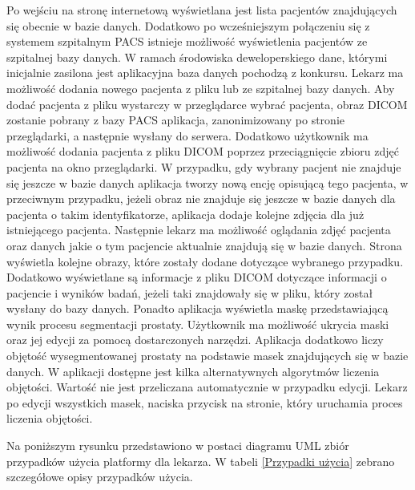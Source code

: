 \documentclass[a4paper,11pt,twoside]{report}
\theoremstyle{definition}
\begin{document}
Po wejściu na stronę internetową wyświetlana jest lista pacjentów znajdujących się obecnie w bazie danych. Dodatkowo po wcześniejszym połączeniu się z systemem szpitalnym PACS istnieje możliwość wyświetlenia pacjentów ze szpitalnej bazy danych. W ramach środowiska deweloperskiego dane, którymi inicjalnie zasilona jest aplikacyjna baza danych pochodzą z konkursu. \cite{konkurs}
Lekarz ma możliwość dodania nowego pacjenta z pliku lub ze szpitalnej bazy danych. Aby dodać pacjenta z pliku wystarczy w przeglądarce wybrać pacjenta, obraz DICOM zostanie pobrany z bazy PACS aplikacja, zanonimizowany po stronie przeglądarki, a następnie wysłany do serwera. Dodatkowo użytkownik ma możliwość dodania pacjenta z pliku DICOM poprzez przeciągnięcie zbioru zdjęć pacjenta na okno przeglądarki. W przypadku, gdy wybrany pacjent nie znajduje się jeszcze w bazie danych aplikacja tworzy nową encję opisującą tego pacjenta, w przeciwnym przypadku, jeżeli obraz nie znajduje się jeszcze w bazie danych dla pacjenta o takim identyfikatorze, aplikacja dodaje kolejne zdjęcia dla już istniejącego pacjenta.
Następnie lekarz ma możliwość oglądania zdjęć pacjenta oraz danych jakie o tym pacjencie aktualnie znajdują się w bazie danych. Strona wyświetla kolejne obrazy, które zostały dodane dotyczące wybranego przypadku. Dodatkowo wyświetlane są informacje z pliku DICOM dotyczące informacji o pacjencie i wyników badań, jeżeli taki znajdowały się w pliku, który  został wysłany do bazy danych. Ponadto aplikacja wyświetla maskę przedstawiającą wynik procesu segmentacji prostaty. Użytkownik ma możliwość ukrycia maski oraz jej edycji za pomocą dostarczonych narzędzi. 
Aplikacja dodatkowo liczy objętość wysegmentowanej prostaty na podstawie masek znajdujących się w bazie danych. W aplikacji dostępne jest kilka alternatywnych algorytmów liczenia objętości. Wartość nie jest przeliczana automatycznie w przypadku edycji. Lekarz po edycji wszystkich masek, naciska przycisk na stronie, który uruchamia proces liczenia objętości.
\par
Na poniższym rysunku przedstawiono w postaci diagramu UML zbiór przypadków użycia platformy dla lekarza. W tabeli \ref{Przypadki użycia} zebrano szczegółowe opisy przypadków użycia.
\par
\end{document}
